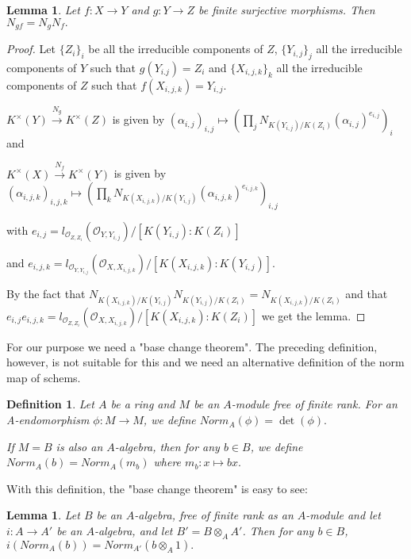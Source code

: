 \documentclass{article}
\theoremstyle{theorem}
\newtheorem*{definition*}{Definition}
\newtheorem{lemma}[theorem]{Lemma}
\theoremstyle{definition}
\begin{document}
    \begin{lemma}
        Let $f : X \rightarrow Y$ and $g : Y \rightarrow Z$ be finite surjective morphisms. Then $N_{gf} = N_g N_f.$
    \end{lemma}
    \begin{proof}
        Let $\{Z_i\}_i$ be all the irreducible components of $Z$, $\{Y_{i,j}\}_j$ all the irreducible components of $Y$ such that $g(Y_{i.j}) = Z_i$ and $\{X_{i,j,k}\}_k$ all the irreducible components of $Z$ such that $f(X_{i,j,k}) = Y_{i,j}.$
        
        $K^\times(Y) \xrightarrow{N_g} K^\times(Z)$ is given by $(\alpha_{i,j})_{i,j} \mapsto (\prod_j N_{K(Y_{i,j})/K(Z_i)}(\alpha_{i,j})^{e_{i,j}})_i$ and
        
        $K^\times(X) \xrightarrow{N_f} K^\times(Y)$ is given by $(\alpha_{i,j,k})_{i,j,k} \mapsto (\prod_k N_{K(X_{i,j,k})/K(Y_{i,j})}(\alpha_{i,j,k})^{e_{i,j,k}})_{i,j}$
        
        with $e_{i,j} = l_{\mathcal O_{Z, Z_i}}(\mathcal O_{Y, Y_{i,j}}) / [K(Y_{i,j}):K(Z_i)]$
        
        and $e_{i,j,k} = l_{\mathcal O_{Y, Y_{i,j}}}(\mathcal O_{X, X_{i,j,k}}) / [K(X_{i,j,k}):K(Y_{i,j})]$.
        
        By the fact that $N_{K(X_{i,j,k})/K(Y_{i,j})} N_{K(Y_{i,j})/K(Z_i)} = N_{K(X_{i,j,k})/K(Z_i)}$ and that $e_{i,j}e_{i,j,k} = l_{\mathcal O_{Z, Z_i}}(\mathcal O_{X, X_{i,j,k}}) / [K(X_{i,j,k}):K(Z_i)]$ we get the lemma.
        
    \end{proof}
    
    
    For our purpose we need a "base change theorem". The preceding definition, however, is not suitable for this and we need an alternative definition of the norm map of schems.
    
    \begin{definition*}
        Let $A$ be a ring and $M$ be an $A$-module free of finite rank. For an A-endomorphism $\phi : M \rightarrow M$, we define $Norm_A(\phi) = \det(\phi).$
        
        If $M = B$ is also an $A$-algebra, then for any $b \in B$, we define $Norm_A(b) = Norm_A(m_b)$ where $m_b : x \mapsto bx.$
    \end{definition*}
    
    With this definition, the "base change theorem" is easy to see:
    
    \begin{lemma}
        Let $B$ be an $A$-algebra, free of finite rank as an $A$-module and let $i : A \rightarrow A'$ be an $A$-algebra, and let $B' = B \otimes_A A'$. Then for any $b \in B$, $i(Norm_A(b)) = Norm_{A'}(b \otimes_A 1).$
    \end{lemma}
    
\end{document}
